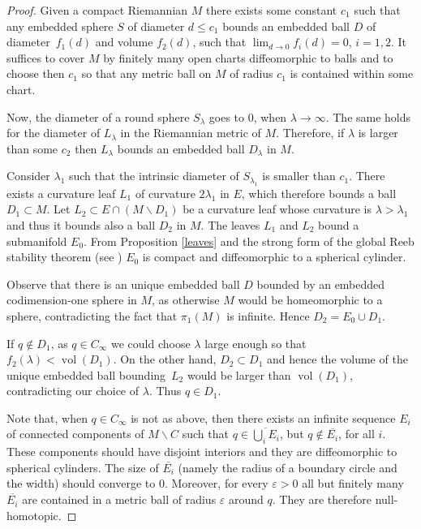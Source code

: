 \documentclass[10pt]{amsart}
\let\moins\smallsetminus
\DeclareMathOperator{\vol}{vol}
\theoremstyle{definition}
\theoremstyle{remark}
\numberwithin{equation}{section}
\begin{document}
\begin{proof}
Given a compact Riemannian
$M$ there exists some constant $c_1$ such that
any embedded sphere $S$ of diameter $d\leq c_1$ bounds an embedded ball $D$ of
diameter~$f_1(d)$ and volume $f_2(d)$, such that $\lim_{d\to 0}f_i(d)=0$, $i=1,2$.
It suffices to cover $M$ by finitely many open charts
diffeomorphic to balls and to choose then $c_1$ so that any metric ball on $M$
of radius $c_1$ is contained within some chart.

Now, the diameter of a round sphere $S_{\lambda}$ goes to $0$,
when $\lambda\to \infty$. The same holds for the diameter of $L_{\lambda}$
in the Riemannian metric of $M$.
Therefore, if $\lambda$ is larger than some $c_2$ then $L_{\lambda}$
bounds an embedded ball $D_{\lambda}$ in $M$.

Consider $\lambda_{1}$ such that the intrinsic diameter of $S_{\lambda_{1}}$ is smaller than $c_1$.
There exists a curvature leaf $L_1$ of curvature $2\lambda_{1}$ in $E$, which therefore bounds a
ball $D_1\subset M$.
Let $L_2\subset E\cap (M\moins D_1)$ be a curvature leaf whose
curvature is $\lambda >\lambda_{1}$ and thus it bounds
also a ball $D_2$ in $M$. The leaves $L_1$ and $L_2$ bound a
submanifold $E_0$. From Proposition \ref{leaves} and the strong form of the global Reeb stability theorem
(see \cite{Mil,EMS}) $E_0$ is compact and diffeomorphic to a spherical cylinder.

Observe that there is an unique embedded ball $D$ bounded by an
embedded codimension-one sphere in $M$, as otherwise
$M$ would be homeomorphic to a sphere, contradicting the fact that
$\pi_1(M)$ is infinite. Hence $D_2=E_0\cup D_1$.

If $q\not\in D_1$, as $q\in C_{\infty}$ we could choose $\lambda$
large enough so that $f_2(\lambda) < \vol(D_1)$.
On the other hand, $D_2\subset D_1$ and hence the volume of the unique
embedded ball bounding~$L_2$ would be larger than $ \vol(D_1)$,
contradicting our choice of $\lambda$.
Thus $q\in D_1$.

Note that, when $q\in C_{\infty}$ is not as above, then there exists an infinite sequence $E_i$ of connected components of $M\moins C$ such that
$q\in \overline{\bigcup_i E_i}$, but $q\not\in \overline{E_i}$, for all $i$.
These components should have disjoint interiors and they are diffeomorphic to spherical cylinders.
The size of $\overline{E_i}$ (namely the radius of a boundary circle and the width)
should converge to $0$. Moreover, for every $\varepsilon >0$ all but finitely many $\overline{E_i}$
are contained in a metric ball of radius $\varepsilon$ around $q$. They are therefore null-homotopic.
\end{proof}
\end{document}
